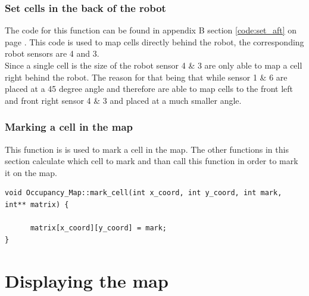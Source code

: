 \subsubsection{Set cells in the back of the robot}
The code for this function can be found in appendix B section \ref{code:set_aft} on page \pageref{code:set_aft}. 
This code is used to map cells directly behind the robot, the corresponding robot sensors are 4 and 3. \\
Since a single cell is the size of the robot sensor 4 \& 3 are only able to map a cell right behind the robot. The reason for that being that while sensor 1 \& 6 are placed at a 45 degree angle and therefore are able to map cells to the front left and front right sensor 4 \& 3 and placed at a much smaller angle. 

\subsubsection{Marking a cell in the map}
This function is is used to mark a cell in the map. The other functions in this section calculate which cell to mark and than call this function in order to mark it on the map.

\begin{lstlisting}[caption = {Mark a cell on the map}]
void Occupancy_Map::mark_cell(int x_coord, int y_coord, int mark, int** matrix) {

      matrix[x_coord][y_coord] = mark;
}
\end{lstlisting}

\section{Displaying the map}

